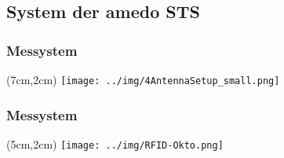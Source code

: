 \subsection{System der amedo STS}
\begin{frame}
  \frametitle{Messystem}
	\begin{textblock*}{5cm}(7cm,2cm) %
  		\texttt{[image: ../img/4AntennaSetup\_small.png]}
  	\end{textblock*}
\end{frame}
\begin{frame}
  \frametitle{Messystem}
	\begin{textblock*}{7cm}(5cm,2cm) %
  		\texttt{[image: ../img/RFID-Okto.png]}
  	\end{textblock*}
\end{frame}

